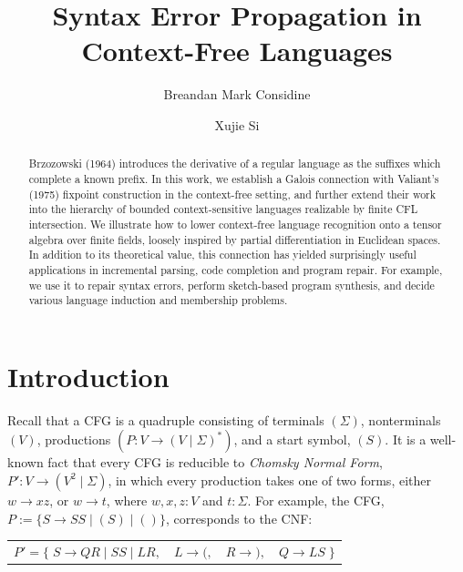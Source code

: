 \documentclass[sigplan,nonacm,anonymous]{acmart}\settopmatter{printfolios=false,printccs=false,printacmref=false}
\begin{document}
  \title{Syntax Error Propagation in Context-Free Languages}
  \begin{abstract}
    Brzozowski (1964) introduces the derivative of a regular language as the suffixes which complete a known prefix. In this work, we establish a Galois connection with Valiant's (1975) fixpoint construction in the context-free setting, and further extend their work into the hierarchy of bounded context-sensitive languages realizable by finite CFL intersection. We illustrate how to lower context-free language recognition onto a tensor algebra over finite fields, loosely inspired by partial differentiation in Euclidean spaces. In addition to its theoretical value, this connection has yielded surprisingly useful applications in incremental parsing, code completion and program repair. For example, we use it to repair syntax errors, perform sketch-based program synthesis, and decide various language induction and membership problems.
  \end{abstract}

  \author{Breandan Mark Considine}

  \author{Xujie Si}

  \maketitle

  \section{Introduction}

  Recall that a CFG is a quadruple consisting of terminals $(\Sigma)$, nonterminals $(V)$, productions $(P\colon V \rightarrow (V \mid \Sigma)^*)$, and a start symbol, $(S)$. It is a well-known fact that every CFG is reducible to \textit{Chomsky Normal Form}, $P'\colon V \rightarrow (V^2 \mid \Sigma)$, in which every production takes one of two forms, either $w \rightarrow xz$, or $w \rightarrow t$, where $w, x, z: V$ and $t: \Sigma$. For example, the CFG, $P:=\{S \rightarrow S S \mid ( S ) \mid ()\}$, corresponds to the CNF:\vspace{-3pt}

  \begin{table}[H]
    \begin{tabular}{llll}
      $P'=\big\{\;S\rightarrow QR \mid SS \mid LR,$ & $L \rightarrow (,$ & $R \rightarrow ),$ & $Q\rightarrow LS\;\big\}$
    \end{tabular}
  \end{table}\vspace{-8pt}
\end{document}
